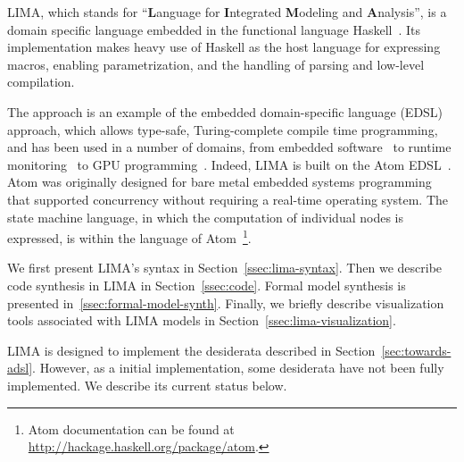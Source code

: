 


LIMA, which stands for ``\textbf{L}anguage for \textbf{I}ntegrated
\textbf{M}odeling and \textbf{A}nalysis'', is a domain specific
language embedded in the functional language Haskell~\cite{haskell98}. Its
implementation makes heavy use of Haskell as the host language for
expressing macros, enabling parametrization, and the handling of
parsing and low-level compilation.

The approach is an example of the embedded domain-specific language (EDSL) approach, which allows type-safe, Turing-complete compile time programming, and has been used in a number of domains, from embedded software~\cite{ivory-15} to runtime monitoring~\cite{pike-rv} to GPU programming~\cite{Chakravarty:2011:AHA:1926354.1926358}. Indeed, LIMA is built on the Atom EDSL~\cite{atom}. Atom was originally designed for bare metal embedded systems programming that supported concurrency without requiring a real-time operating system. The state machine language, in which the computation of individual nodes is expressed, is within the language of Atom~\footnote{Atom documentation can be found at \url{http://hackage.haskell.org/package/atom}.}.

We first present LIMA's syntax in Section~\ref{ssec:lima-syntax}. Then we describe code synthesis in LIMA in Section~\ref{ssec:code}. Formal model synthesis is presented in~\ref{ssec:formal-model-synth}. Finally, we briefly describe visualization tools associated with LIMA models in Section~\ref{ssec:lima-visualization}.

LIMA is designed to implement the desiderata described in Section~\ref{sec:towards-adsl}. However, as a initial implementation, some desiderata have not been fully implemented. We describe its current status below.


